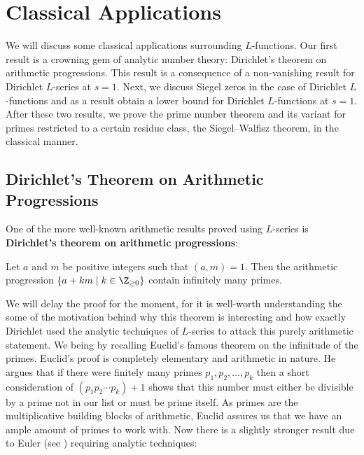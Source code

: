 \chapter{Classical Applications}
  We will discuss some classical applications surrounding $L$-functions. Our first result is a crowning gem of analytic number theory: Dirichlet's theorem on arithmetic progressions. This result is a consequence of a non-vanishing result for Dirichlet $L$-series at $s = 1$. Next, we discuss Siegel zeros in the case of Dirichlet $L$-functions and as a result obtain a lower bound for Dirichlet $L$-functions at $s = 1$. After these two results, we prove the prime number theorem and its variant for primes restricted to a certain residue class, the Siegel–Walfisz theorem, in the classical manner.
  \section{Dirichlet's Theorem on Arithmetic Progressions}
    One of the more well-known arithmetic results proved using $L$-series is \textbf{Dirichlet's theorem on arithmetic progressions}:

    \begin{theorem}\label{thm:Dirichlet's_theorem_on_primes_in_arithmetic_progressions}
      Let $a$ and $m$ be positive integers such that $(a,m) = 1$. Then the arithmetic progression $\{a+km \mid k \in \Z_{\ge 0}\}$ contain infinitely many primes.
    \end{theorem}

    We will delay the proof for the moment, for it is well-worth understanding the some of the motivation behind why this theorem is interesting and how exactly Dirichlet used the analytic techniques of $L$-series to attack this purely arithmetic statement. We being by recalling Euclid's famous theorem on the infinitude of the primes. Euclid's proof is completely elementary and arithmetic in nature. He argues that if there were finitely many primes $p_{1},p_{2},\ldots,p_{k}$ then a short consideration of $(p_{1}p_{2} \cdots p_{k})+1$ shows that this number must either be divisible by a prime not in our list or must be prime itself. As primes are the multiplicative building blocks of arithmetic, Euclid assures us that we have an ample amount of primes to work with. Now there is a slightly stronger result due to Euler (see \cite{euler1744variae}) requiring analytic techniques:

